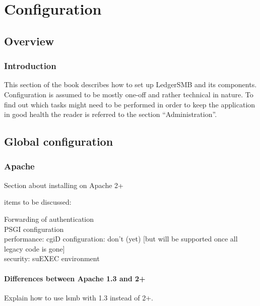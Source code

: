 
\part{Configuration}
\label{part-configuration}


\chapter{Overview}
\label{cha-configuration-overview}

\section{Introduction}
\label{sec-config-overview-introduction}
This section of the book describes how to set up LedgerSMB and its components.
Configuration is assumed to be mostly one-off and rather technical in nature.  To find
out which tasks might need to be performed in order to keep the application in good
health the reader is referred to the section ``Administration''. 

\chapter{Global configuration}
\label{cha-global-configuration}

\section{Apache}
\label{sec-global-config-apache}

Section about installing on Apache 2+

items to be discussed:

Forwarding of authentication \\
PSGI configuration \\
performance: cgiD configuration: don't (yet) [but will be supported once all legacy code is gone] \\
security: suEXEC environment \\

\subsection{Differences between Apache 1.3 and 2+}
\label{subsec-global-config-apache-13-vs-2}

Explain how to use lsmb with 1.3 instead of 2+.

